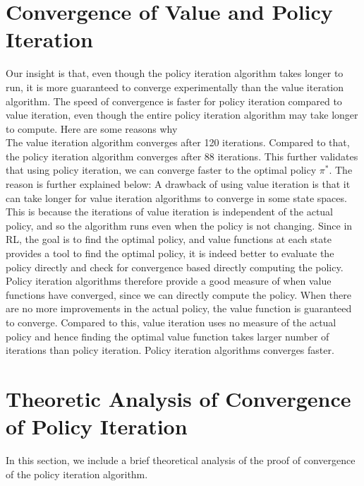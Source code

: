 \documentclass{article}\usepackage[]{graphicx}\usepackage[]{color}
\let\Oldsection\section
\renewcommand{\section}{\FloatBarrier\Oldsection}
\theoremstyle{plain}
\begin{document}
\section{Convergence of Value and Policy Iteration}


\noindent
Our insight is that, even though the policy iteration algorithm takes longer to run, it is more guaranteed to converge experimentally than the value iteration algorithm. The speed of convergence is faster for policy iteration compared to value iteration, even though the entire policy iteration algorithm may take longer to compute. Here are some reasons why\\


\noindent
The value iteration algorithm converges after 120 iterations. Compared to that, the policy iteration algorithm converges after 88 iterations. This further validates that using policy iteration, we can converge faster to the optimal policy $\pi^{*}$. The reason is further explained below:
\noindent
A drawback of using value iteration is that it can take longer for value iteration algorithms to converge in some state spaces. This is because the iterations of value iteration is independent of the actual policy, and so the algorithm runs even when the policy is not changing. Since in RL, the goal is to find the optimal policy, and value functions at each state provides a tool to find the optimal policy, it is indeed better to evaluate the policy directly and check for convergence based directly computing the policy. Policy iteration algorithms therefore provide a good measure of when value functions have converged, since we can directly compute the policy. When there are no more improvements in the actual policy, the value function is guaranteed to converge. Compared to this, value iteration uses no measure of the actual policy and hence finding the optimal value function takes larger number of iterations than policy iteration. Policy iteration algorithms converges faster. 








\section{Theoretic Analysis of Convergence of Policy Iteration}

\noindent
In this section, we include a brief theoretical analysis of the proof of convergence of the policy iteration algorithm.\\
\end{document}
